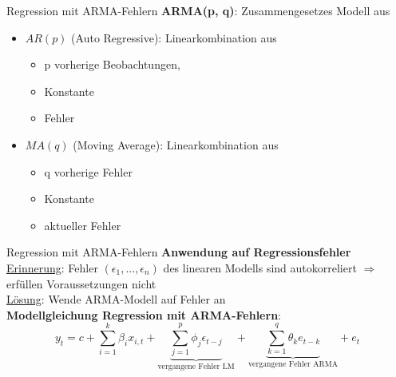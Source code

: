 \begin{frame}{Regression mit ARMA-Fehlern}
	\textbf{ARMA(p, q)}: Zusammengesetzes Modell aus\\
	\begin{itemize}
		\item $AR(p)$ (Auto Regressive): Linearkombination aus
		\begin{itemize}
			\item p vorherige Beobachtungen, 
			\item Konstante
			\item Fehler
		\end{itemize}
		\item $MA(q)$ (Moving Average): Linearkombination aus
		\begin{itemize}
			\item q vorherige Fehler
			\item Konstante
			\item aktueller Fehler
		\end{itemize}
	\end{itemize}
\end{frame}

\begin{frame}{Regression mit ARMA-Fehlern}
	\textbf{Anwendung auf Regressionsfehler} \\
	\underline{Erinnerung}: Fehler $(\epsilon_1,...,\epsilon_n)$ des linearen Modells sind autokorreliert $\Rightarrow$ erfüllen Voraussetzungen nicht\\
	\underline{Lösung}: Wende ARMA-Modell auf Fehler an \\
	\textbf{Modellgleichung Regression mit ARMA-Fehlern}:
	$$y_t = c + \sum_{i=1}^{k}{\beta_i x_{i,t}} + \underbrace{\sum_{j=1}^{p}{\phi_j\epsilon_{t-j}}}_{\text{vergangene Fehler LM}} + \underbrace{\sum_{k=1}^{q}{\theta_k e_{t-k}}}_{\text{vergangene Fehler ARMA}} + e_t$$
	
\end{frame}

